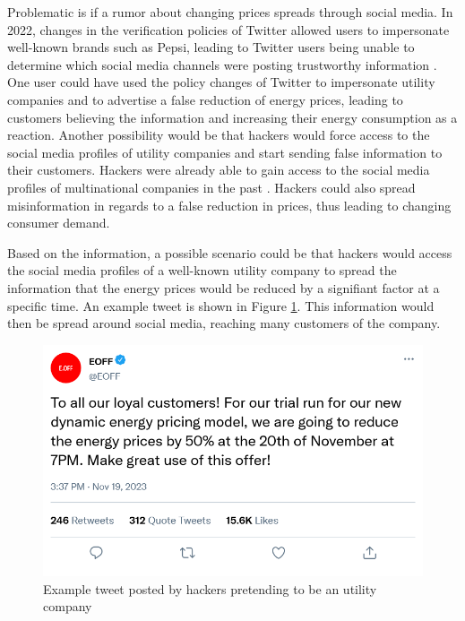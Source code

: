 Problematic is if a rumor about changing prices spreads through social media.
In 2022, changes in the verification policies of Twitter allowed users 
to impersonate well-known brands such as Pepsi, leading to Twitter 
users being unable to determine which social media channels were
posting trustworthy information \cite{twitterchaos}. One user could
have used the policy changes of Twitter to impersonate	utility companies
and to advertise a false reduction of energy prices, leading to customers
believing the information and increasing their energy consumption as a 
reaction. Another possibility would be that hackers would force access to the
social media profiles of utility companies and start sending false 
information to their customers. Hackers were already able to gain access
to the social media profiles of multinational companies in the past
\cite{twitterhacker}. Hackers could also spread misinformation in regards
to a false reduction in prices, thus leading to changing consumer demand.

Based on the information, a possible scenario could be that hackers would
access the social media profiles of a well-known utility company
to spread the information that the energy prices would be reduced by 
a signifiant factor at a specific time. An example tweet is shown in 
Figure \ref{demandtweet}. This information would then be 
spread around social media, reaching many customers of the company.

\begin{figure}[!ht]
    \center
    \includegraphics[scale=.4]{figs/eondemandresponse.png}
    \caption{Example tweet posted by hackers pretending to be an utility company}
    \label{demandtweet}
\end{figure}

